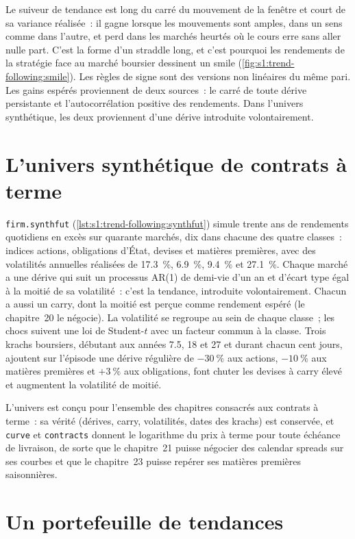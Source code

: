 Le suiveur de tendance est long du carré du mouvement de la fenêtre et court de sa variance réalisée~: il gagne lorsque les mouvements sont amples, dans un sens comme dans l'autre, et perd dans
les marchés heurtés où le cours erre sans aller nulle part. C'est la forme d'un straddle long, et c'est pourquoi les rendements de la stratégie face au
marché boursier dessinent un smile (\cref{fig:s1:trend-following:smile}). Les règles de signe sont des versions non linéaires du même pari. Les gains espérés proviennent de deux
sources~: le carré de toute dérive persistante et l'autocorrélation positive des rendements. Dans l'univers synthétique, les deux proviennent d'une dérive introduite volontairement.

\section{L'univers synthétique de contrats à terme}

\texttt{firm.synthfut} (\cref{lst:s1:trend-following:synthfut}) simule trente ans de rendements quotidiens en excès sur quarante marchés, dix dans chacune des quatre
classes~: indices actions, obligations d'État, devises et matières premières, avec des volatilités annuelles réalisées de 17.3~\%, 6.9~\%, 9.4~\% et 27.1~\%. Chaque
marché a une dérive qui suit un processus AR(1) de demi-vie d'un an et d'écart type égal à la moitié de sa volatilité~: c'est la tendance, introduite volontairement. Chacun
a aussi un carry, dont la moitié est perçue comme rendement espéré (le chapitre~20 le négocie). La volatilité se regroupe au sein de chaque classe~; les chocs suivent une loi de Student-$t$ avec un
facteur commun à la classe. Trois krachs boursiers, débutant aux années 7.5, 18 et 27 et durant chacun cent jours, ajoutent sur l'épisode une dérive régulière de $-30~\%$ aux actions, $-10~\%$
aux matières premières et $+3~\%$ aux obligations, font chuter les devises à carry élevé et augmentent la volatilité de moitié.

L'univers est conçu pour l'ensemble des chapitres consacrés aux contrats à terme~: sa vérité (dérives, carry, volatilités, dates des krachs) est conservée, et \texttt{curve} et
\texttt{contracts} donnent le logarithme du prix à terme pour toute échéance de livraison, de sorte que le chapitre~21 puisse négocier des calendar spreads sur ses courbes et que le chapitre~23 puisse repérer ses
matières premières saisonnières.

\section{Un portefeuille de tendances}


